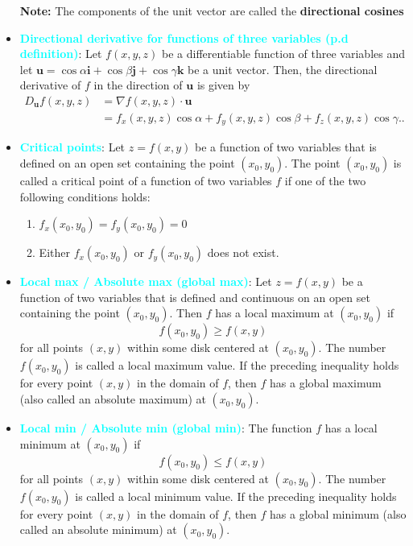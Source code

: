 \documentclass{report}
\begin{document}
\begin{itemize}
        \textbf{Note:} The components of the unit vector are called the \textbf{directional cosines}
    \item \textbf{\textcolor{cyan}{Directional derivative for functions of three variables (p.d definition)}}:
        Let $f(x,y,z)$ be a differentiable function of three variables and let $\mathbf{u}=\cos\alpha\mathbf{i}+\cos\beta\mathbf{j}+\cos\gamma\mathbf{k}$ be a unit vector. Then, the directional derivative of $f$ in the direction of $\mathbf{u}$ is given by
        \begin{align*}
            D_{\mathbf{u}}f(x,y,z) &= \nabla f(x,y,z) \cdot \mathbf{u}  \\
            &= f_x(x,y,z)\cos\alpha + f_y(x,y,z)\cos\beta + f_z(x,y,z)\cos\gamma.
        .\end{align*}
    \item \textbf{\textcolor{cyan}{Critical points}}: 
        Let $z = f(x, y)$ be a function of two variables that is defined on an open set containing the point $(x_0, y_0)$. The point $(x_0, y_0)$ is called a critical point of a function of two variables $f$ if one of the two following conditions holds:
        \begin{enumerate}
            \item $f_x(x_0, y_0) = f_y(x_0, y_0) = 0$
            \item Either $f_x(x_0, y_0)$ or $f_y(x_0, y_0)$ does not exist.
        \end{enumerate}
    \item \textbf{\textcolor{cyan}{Local max / Absolute max (global max)}}:
        Let $z = f(x, y)$ be a function of two variables that is defined and continuous on an open set containing the point $(x_0, y_0)$. Then $f$ has a local maximum at $(x_0, y_0)$ if
        \[ f(x_0, y_0) \geq f(x, y) \]
        for all points $(x, y)$ within some disk centered at $(x_0, y_0)$. The number $f(x_0, y_0)$ is called a local maximum value. If the preceding inequality holds for every point $(x, y)$ in the domain of $f$, then $f$ has a global maximum (also called an absolute maximum) at $(x_0, y_0)$.
    \item \textbf{\textcolor{cyan}{Local min / Absolute min (global min)}}:
        The function $f$ has a local minimum at $(x_0, y_0)$ if
        \[ f(x_0, y_0) \leq f(x, y) \]
        for all points $(x, y)$ within some disk centered at $(x_0, y_0)$. The number $f(x_0, y_0)$ is called a local minimum value. If the preceding inequality holds for every point $(x, y)$ in the domain of $f$, then $f$ has a global minimum (also called an absolute minimum) at $(x_0, y_0)$.

\end{itemize}
\end{document}
